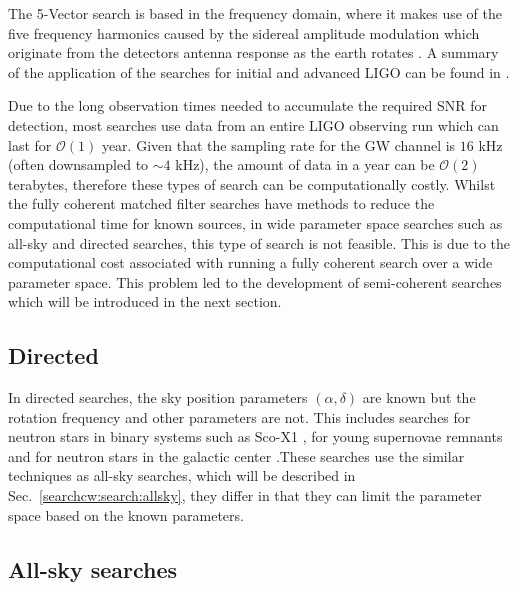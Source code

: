 The 5-Vector search is based in the frequency domain, where it makes
use of the five frequency harmonics caused by the sidereal amplitude
modulation which originate from the detectors antenna response as
the earth rotates \citep{astone2010MethodDetection,aasi2014GRAVITATIONALWAVES}.
A summary of the application of the searches for initial and advanced
\gls{LIGO} can be found in
\citep{aasi2014GRAVITATIONALWAVES,abbott2019SearchesGravitationala}.

Due to the long observation times needed to accumulate the required \gls{SNR}
for detection, most searches use data from an entire \gls{LIGO} observing run
which can last for $\mathcal{O}(1)$ year.  Given
that the sampling rate for the \gls{GW} channel is $16$ kHz (often downsampled
to $\sim 4$ kHz), the amount of data in a year can be $\mathcal{O}(2)$
terabytes, therefore these types of search can be computationally costly.
Whilst the fully coherent matched filter searches have methods to reduce the
computational time for known sources, in wide parameter space searches such as all-sky and directed searches, this
type of search is not feasible. 
This is due to the computational cost associated with running a fully coherent search over a wide parameter space.
This problem led to the development of semi-coherent searches which will be introduced in the
next section. 

\subsection{\label{searchcw:search:directed}Directed}

In directed searches, the sky position parameters
$(\alpha,\delta)$ are known but the rotation frequency and other parameters are not. 
This includes searches for neutron stars in binary systems such as Sco-X1
\citep{abbott2017UpperLimits,meadors2016TuningScorpius}, for young supernovae remnants \citep{abadie2010FIRSTSEARCH} and for neutron stars in the galactic center \citep{piccinni2019DirectedSearch}.These searches use
the similar techniques as all-sky searches, which will be described in
Sec.~\ref{searchcw:search:allsky}, they differ in that they can limit the
parameter space based on the known parameters.

\subsection{\label{searchcw:search:allsky}All-sky searches}

